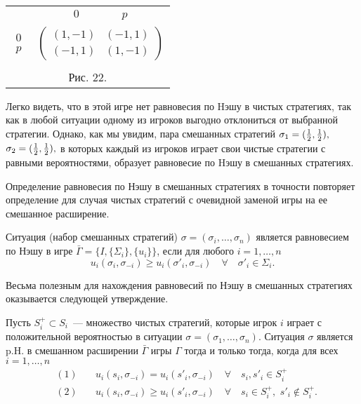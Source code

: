 \documentclass[12pt]{article}
\begin{document}
{\begin{center}
\begin{tabular}{cc}
&$\begin{array}{cc} 0\qquad&\quad p\end{array}$\\
$\begin{array}{c} 0\\p\end{array}$& $\left(\begin{array}{cc}
(1,-1)&(-1,1)\\
(-1,1)&(1,-1) \end{array}\right)$\\
\multicolumn{2}{c}{}\\
\multicolumn{2}{c}{Рис. 22.}\\
\end{tabular}
\end{center}

Легко видеть, что в этой игре нет равновесия по Hэшу в чистых
стратегиях, так как в любой ситуации одному из игроков выгодно
отклониться от выбранной стратегии. Однако, как мы увидим, пара
смешанных стратегий $\sigma_1=({1\over 2},{1\over 2}),$
$\sigma_2=({1\over 2},{1\over 2}),$ в которых каждый из игроков
играет свои чистые стратегии с равными вероятностями, образует
равновесие по Hэшу в смешанных стратегиях.

Определение равновесия по Нэшу в смешанных стратегиях в точности
повторяет определение для случая чистых стратегий с очевидной
заменой игры на ее смешанное расширение.

\begin{definition}
Ситуация (набор смешанных стратегий)
$\sigma=(\sigma_i,\ldots,\sigma_n)$ является равновесием по Нэшу в
игре $\bar\Gamma=\{I,\{\Sigma_i\},\{u_i\}\}$, если для любого
$i=1,\ldots,n$
$$
u_i(\sigma_i,\sigma_{-i})\ge u_i(\sigma'_i,\sigma_{-
i})\quad\forall\quad\sigma'_i\in\Sigma_i.
$$
\end{definition}

Весьма полезным для нахождения равновесий по Нэшу в смешанных
стратегиях оказывается следующей утверждение.

\begin{proposition}
Пусть $S^+_i\subset S_i$~---  множество чистых стратегий, которые
игрок $i$ играет с положительной вероятностью в ситуации
$\sigma=(\sigma_1,\ldots,\sigma_n)$.  Ситуация $\sigma$ является
p.H. в смешанном расширении $\bar\Gamma$ игры $\Gamma$ тогда и
только тогда, когда для всех $i=1,\ldots,n$
$$
\begin{array}{rcl} &(1)&\quad
u_i(s_i,\sigma_{-i})=u_i(s'_i,\sigma_{-i})\quad\forall\quad
s_i,s'_i\in
S_i^+\\[10pt]
&(2)&\quad u_i(s_i,\sigma_{-i})\ge u_i(s'_i,\sigma_{-i})\quad
\forall\quad s_i\in S^+_i,\,\,s'_i\notin S_i^+. \end{array}
$$
\end{proposition}

}
\end{document}
